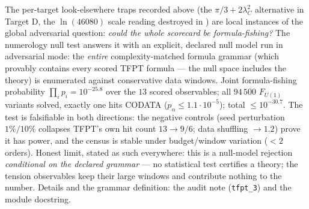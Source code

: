 \documentclass[11pt,a4paper]{article}
\begin{document}
\begin{winbox}
The per-target look-elsewhere traps recorded above (the $\pi/3+2\lambda_C^2$ alternative in Target D, the
$\ln(46080)$ scale reading destroyed in ) are local instances of the global
adversarial question: \emph{could the whole scorecard be formula-fishing?} The numerology null test answers
it with an explicit, declared null model run in adversarial mode: the \emph{entire} complexity-matched
formula grammar (which provably contains every scored TFPT formula --- the null space includes the theory)
is enumerated against conservative data windows. Joint formula-fishing probability $\prod_i p_i=10^{-25.8}$
over the $13$ scored observables; all $94\,500$ $F_{U(1)}$ variants solved, exactly one hits CODATA
($p_\alpha\le1.1{\cdot}10^{-5}$); total $\le10^{-30.7}$. The test is falsifiable in both directions: the
negative controls (seed perturbation $1\%/10\%$ collapses TFPT's own hit count $13\to9/6$; data shuffling
$\to1.2$) prove it has power, and the census is stable under budget/window variation ($<2$ orders). Honest
limit, stated as such everywhere: this is a null-model rejection \emph{conditional on the declared grammar}
--- no statistical test certifies a theory; the tension observables keep their large windows and contribute
nothing to the number. Details and the grammar definition: the audit note (\texttt{tfpt\_3}) and the module
docstring.
\end{winbox}
\end{document}
